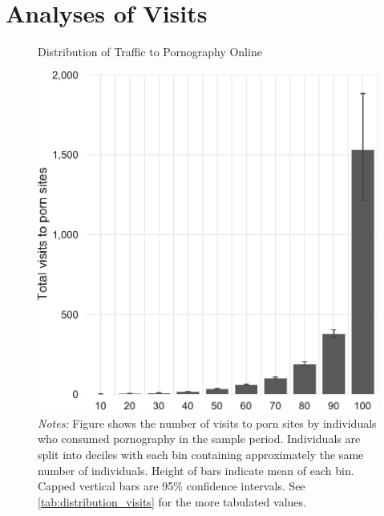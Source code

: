 \documentclass[12pt, letterpaper]{article}
\begin{document}
\section{Analyses of Visits}
\begin{figure}[ht]
	\centering
	\caption{Distribution of Traffic to Pornography Online}
	\includegraphics[width=.5\linewidth]{../figs/distribution_visits_to_adultsites.pdf}
	\caption*{\footnotesize \emph{Notes:} 
		Figure shows the number of visits to porn sites by individuals who consumed pornography in the sample period.
		Individuals are split into deciles with each bin containing approximately the same number of individuals.
		Height of bars indicate mean of each bin.
		Capped vertical bars are 95\% confidence intervals.
		See \cref{tab:distribution_visits} for the more tabulated values.
	}
	\label{fig:distribution_visits}
\end{figure}
\end{document}
